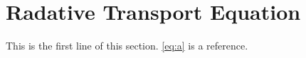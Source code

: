 \documentclass[main]{subfiles}
\begin{document}
\section{Radative Transport Equation}
\label{sec:Radative Transport Equation}

This is the first line of this section.
\eqref{eq:a} is a reference.
\end{document}
